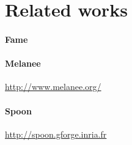 
\section{Related works}

\paragraph{Fame} 
\cite{kuhn2008fame}

\paragraph{Melanee}
\url{http://www.melanee.org/}
\cite{atkinson11}

\paragraph{Spoon}
\url{http://spoon.gforge.inria.fr}
\cite{pawlak2016}

